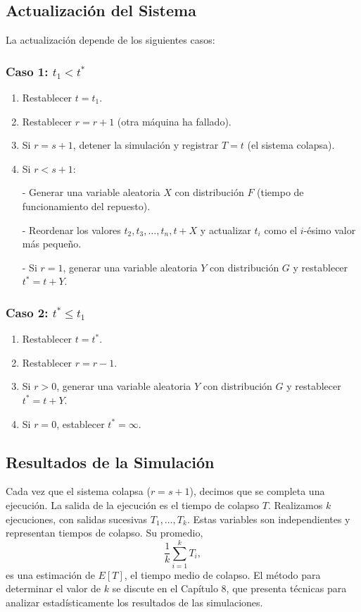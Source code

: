 \documentclass[a4paper, 12pt]{article}
\begin{document}
\subsection*{Actualización del Sistema}
La actualización depende de los siguientes casos:

\subsubsection*{Caso 1: $ t_1 < t^* $}
\begin{enumerate}
    \item Restablecer $ t = t_1 $.
    \item Restablecer $ r = r + 1 $ (otra máquina ha fallado).
    \item Si $ r = s + 1 $, detener la simulación y registrar $ T = t $ (el sistema colapsa).
    \item Si $ r < s + 1 $:
    
        
- Generar una variable aleatoria $ X $ con distribución $ F $ (tiempo de funcionamiento del repuesto).
        
- Reordenar los valores $ t_2, t_3, \dots, t_n, t + X $ y actualizar $ t_i $ como el $ i $-ésimo valor más pequeño.
        
- Si $ r = 1 $, generar una variable aleatoria $ Y $ con distribución $ G $ y restablecer $ t^* = t + Y $.
    
\end{enumerate}

\subsubsection*{Caso 2: $ t^* \leq t_1 $}
\begin{enumerate}
    \item Restablecer $ t = t^* $.
    \item Restablecer $ r = r - 1 $.
    \item Si $ r > 0 $, generar una variable aleatoria $ Y $ con distribución $ G $ y restablecer $ t^* = t + Y $.
    \item Si $ r = 0 $, establecer $ t^* = \infty $.
\end{enumerate}

\subsection*{Resultados de la Simulación}
Cada vez que el sistema colapsa ($ r = s + 1 $), decimos que se completa una ejecución. La salida de la ejecución es el tiempo de colapso $ T $. Realizamos $ k $ ejecuciones, con salidas sucesivas $ T_1, \dots, T_k $. Estas variables son independientes y representan tiempos de colapso. Su promedio,
\[
\frac{1}{k} \sum_{i=1}^k T_i,
\]
es una estimación de $ E[T] $, el tiempo medio de colapso. El método para determinar el valor de $ k $ se discute en el Capítulo 8, que presenta técnicas para analizar estadísticamente los resultados de las simulaciones.
\end{document}
